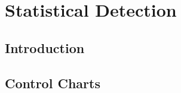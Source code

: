 \chapter{Statistical Detection} \label{chap:stat_det} %

\section {Introduction}
\section {Control Charts}
